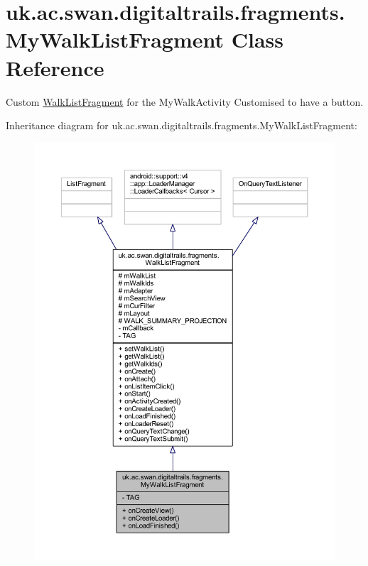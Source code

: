 \hypertarget{classuk_1_1ac_1_1swan_1_1digitaltrails_1_1fragments_1_1_my_walk_list_fragment}{\section{uk.\+ac.\+swan.\+digitaltrails.\+fragments.\+My\+Walk\+List\+Fragment Class Reference}
\label{classuk_1_1ac_1_1swan_1_1digitaltrails_1_1fragments_1_1_my_walk_list_fragment}
}


Custom \hyperlink{classuk_1_1ac_1_1swan_1_1digitaltrails_1_1fragments_1_1_walk_list_fragment}{Walk\+List\+Fragment} for the My\+Walk\+Activity Customised to have a button.  




Inheritance diagram for uk.\+ac.\+swan.\+digitaltrails.\+fragments.\+My\+Walk\+List\+Fragment\+:
\nopagebreak
\begin{figure}[H]
\begin{center}
\leavevmode
\includegraphics[width=350pt]{classuk_1_1ac_1_1swan_1_1digitaltrails_1_1fragments_1_1_my_walk_list_fragment__inherit__graph}
\end{center}
\end{figure}


